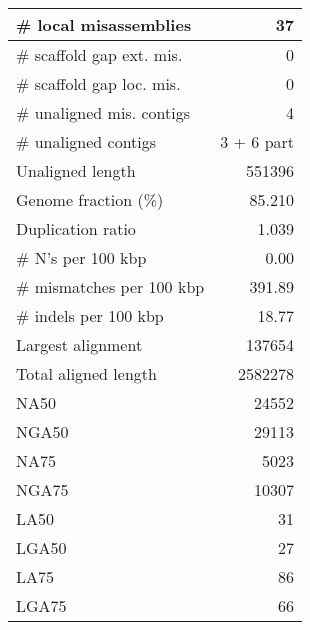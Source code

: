 \documentclass[12pt,a4paper]{article}
\begin{document}
\begin{table}[ht]
\begin{center}
\begin{tabular}{|l*{1}{|r}|}
\# local misassemblies & 37 \\ \hline
\# scaffold gap ext. mis. & 0 \\ \hline
\# scaffold gap loc. mis. & 0 \\ \hline
\# unaligned mis. contigs & 4 \\ \hline
\# unaligned contigs & 3 + 6 part \\ \hline
Unaligned length & 551396 \\ \hline
Genome fraction (\%) & 85.210 \\ \hline
Duplication ratio & 1.039 \\ \hline
\# N's per 100 kbp & 0.00 \\ \hline
\# mismatches per 100 kbp & 391.89 \\ \hline
\# indels per 100 kbp & 18.77 \\ \hline
Largest alignment & 137654 \\ \hline
Total aligned length & 2582278 \\ \hline
NA50 & 24552 \\ \hline
NGA50 & 29113 \\ \hline
NA75 & 5023 \\ \hline
NGA75 & 10307 \\ \hline
LA50 & 31 \\ \hline
LGA50 & 27 \\ \hline
LA75 & 86 \\ \hline
LGA75 & 66 \\ \hline
\end{tabular}
\end{center}
\end{table}
\end{document}
